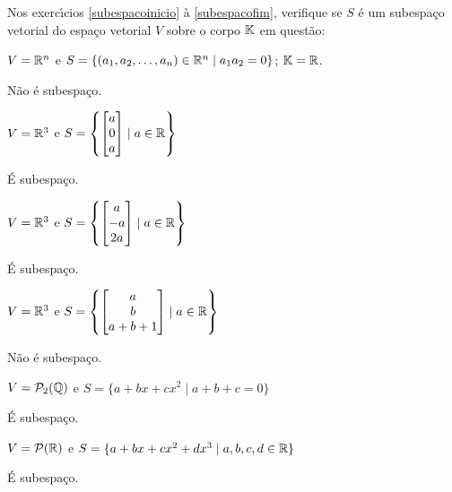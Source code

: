 \documentclass[12pt]{exam}
\begin{document}
Nos exerc{\'\i}cios \ref{subespacoinicio} \`a \ref{subespacofim}, verifique se $S$ \'e um subespa\c{c}o vetorial do espa\c{c}o vetorial $V$ sobre o corpo $\mathbb{K}$ em quest\~ao:
\begin{exercicio}\label{subespacoinicio}
	$V = \mathbb{R}^n$ e $S = \{(a_1, a_2, \dots, a_n) \in \mathbb{R}^n \mid a_1a_2 = 0\}$; $\mathbb{K} = \mathbb{R}$.
	\begin{solucao}
		N\~ao é subespaço.
	\end{solucao}
\end{exercicio}

\begin{exercicio}
    $V = \mathbb{R}^3$ e $S = \left\{\begin{bmatrix}a\\0\\a\end{bmatrix} \mid a \in \mathbb{R}\right\}$
    \begin{solucao}
    	É subespaço.
    \end{solucao}
\end{exercicio}

\begin{exercicio}
    $V = \mathbb{R}^3$ e $S = \left\{\begin{bmatrix}a\\-a\\2a\end{bmatrix} \mid a \in \mathbb{R}\right\}$
		\begin{solucao}
    	É subespaço.
    \end{solucao}
\end{exercicio}

\begin{exercicio}
    $V = \mathbb{R}^3$ e $S = \left\{\begin{bmatrix}a\\b\\a + b + 1\end{bmatrix} \mid a \in \mathbb{R}\right\}$
    \begin{solucao}
    	Não é subespaço.
    \end{solucao}
\end{exercicio}

\begin{exercicio}
    $V = \mathcal{P}_2(\mathbb{Q})$ e $S = \{a + bx + cx^2 \mid a + b + c = 0\}$
    \begin{solucao}
    	É subespaço.
    \end{solucao}
\end{exercicio}

\begin{exercicio}
    $V = \mathcal{P}(\mathbb{R})$ e $S = \{a + bx + cx^2 + dx^3\mid a, b, c, d \in \mathbb{R}\}$
    \begin{solucao}
    	É subespaço.
    \end{solucao}
\end{exercicio}
\end{document}
